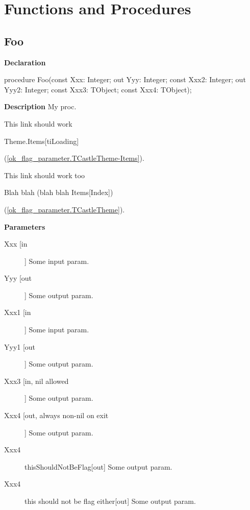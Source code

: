 \documentclass{report}
\begin{document}
\section{Functions and Procedures}
\subsection*{Foo}
\begin{list}{}{
\setlength{\itemindent}{0cm}
\setlength{\listparindent}{0cm}
\setlength{\leftmargin}{\evensidemargin}
\addtolength{\leftmargin}{\tmplength}
\settowidth{\labelsep}{X}
\addtolength{\leftmargin}{\labelsep}
\setlength{\labelwidth}{\tmplength}
}
\begin{flushleft}
\item[\textbf{Declaration}\hfill]
\begin{ttfamily}
procedure Foo(const Xxx: Integer; out Yyy: Integer; const Xxx2: Integer; out Yyy2: Integer; const Xxx3: TObject; const Xxx4: TObject);\end{ttfamily}


\end{flushleft}
\par
\item[\textbf{Description}]
My proc.        

This link should work \begin{ttfamily}Theme.Items[tiLoading]\end{ttfamily}(\ref{ok_flag_parameter.TCastleTheme-Items}).

This link should work too \begin{ttfamily}Blah blah (blah blah Items[Index])\end{ttfamily}(\ref{ok_flag_parameter.TCastleTheme}).\par
\item[\textbf{Parameters}]
\begin{description}
\item[Xxx [in]] Some input param.
\item[Yyy [out]] Some output param.
\item[Xxx1 [in]] Some input param.
\item[Yyy1 [out]] Some output param.
\item[Xxx3 [in, nil allowed]] Some output param.
\item[Xxx4 [out, always non{-}nil on exit]] Some output param.
\item[Xxx4] thisShouldNotBeFlag[out] Some output param.
\item[Xxx4] this should not be flag either[out] Some output param.
\end{description}


\end{list}
\end{document}
